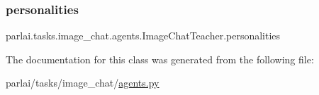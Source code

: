 \subsubsection{\texorpdfstring{personalities}{personalities}}
{\footnotesize\ttfamily parlai.\+tasks.\+image\+\_\+chat.\+agents.\+Image\+Chat\+Teacher.\+personalities}



The documentation for this class was generated from the following file\+:\begin{DoxyCompactItemize}
\item 
parlai/tasks/image\+\_\+chat/\hyperlink{parlai_2tasks_2image__chat_2agents_8py}{agents.\+py}\end{DoxyCompactItemize}
